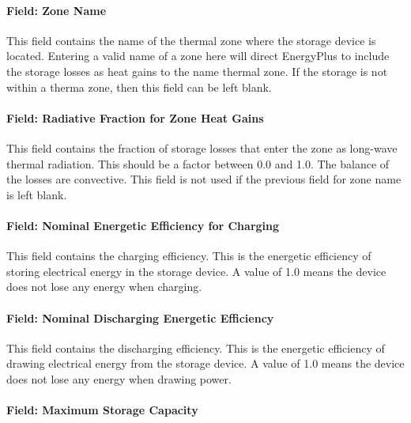 \paragraph{Field: Zone Name}\label{field-zone-name-5-000}

This field contains the name of the thermal zone where the storage device is located. Entering a valid name of a zone here will direct EnergyPlus to include the storage losses as heat gains to the name thermal zone. If the storage is not within a therma zone, then this field can be left blank.

\paragraph{Field: Radiative Fraction for Zone Heat Gains}\label{field-radiative-fraction-for-zone-heat-gains}

This field contains the fraction of storage losses that enter the zone as long-wave thermal radiation. This should be a factor between 0.0 and 1.0. The balance of the losses are convective. This field is not used if the previous field for zone name is left blank.

\paragraph{Field: Nominal Energetic Efficiency for Charging}\label{field-nominal-energetic-efficiency-for-charging}

This field contains the charging efficiency. This is the energetic efficiency of storing electrical energy in the storage device. A value of 1.0 means the device does not lose any energy when charging.

\paragraph{Field: Nominal Discharging Energetic Efficiency}\label{field-nominal-discharging-energetic-efficiency}

This field contains the discharging efficiency. This is the energetic efficiency of drawing electrical energy from the storage device. A value of 1.0 means the device does not lose any energy when drawing power.

\paragraph{Field: Maximum Storage Capacity}\label{field-maximum-storage-capacity}

